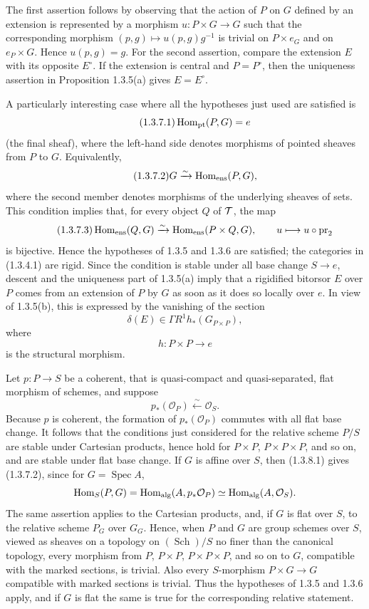 \documentclass[11pt]{article}
\providecommand{\Spec}{\operatorname{Spec}}
\providecommand{\Sch}{\operatorname{Sch}}
\providecommand{\cO}{\mathcal O}
\providecommand{\pr}{\operatorname{pr}}
\providecommand{\Hom}{\operatorname{Hom}}
\begin{document}
The first assertion follows by observing that the action of \(P\) on \(G\) defined by an extension is represented by a morphism \(u:P\times G\to G\) such that the corresponding morphism \((p,g)\mapsto u(p,g)g^{-1}\) is trivial on \(P\times e_G\) and on \(e_P\times G\).  Hence \(u(p,g)=g\).  For the second assertion, compare the extension \(E\) with its opposite \(E^\circ\).  If the extension is central and \(P=P^\circ\), then the uniqueness assertion in Proposition 1.3.5(a) gives \(E=E^\circ\).

A particularly interesting case where all the hypotheses just used are satisfied is
\begin{equation}\tag{1.3.7.1}
  \operatorname{Hom}_{\mathrm{pt}}(P,G)=e
\end{equation}
(the final sheaf), where the left-hand side denotes morphisms of pointed sheaves from \(P\) to \(G\).  Equivalently,
\begin{equation}\tag{1.3.7.2}
  G\xrightarrow{\sim}\operatorname{Hom}_{\mathrm{ens}}(P,G),
\end{equation}
where the second member denotes morphisms of the underlying sheaves of sets.  This condition implies that, for every object \(Q\) of \(\mathcal T\), the map
\begin{equation}\tag{1.3.7.3}
  \Homens(Q,G)\xrightarrow{\sim}\Homens(P\times Q,G),\qquad
  u\longmapsto u\circ\pr_2
\end{equation}
is bijective.  Hence the hypotheses of 1.3.5 and 1.3.6 are satisfied; the categories in (1.3.4.1) are rigid.  Since the condition is stable under all base change \(S\to e\), descent and the uniqueness part of 1.3.5(a) imply that a rigidified bitorsor \(E\) over \(P\) comes from an extension of \(P\) by \(G\) as soon as it does so locally over \(e\).  In view of 1.3.5(b), this is expressed by the vanishing of the section
\[
  \delta(E)\in\Gamma R^1 h_*(G_{P\times P}),
\]
where
\[
  h:P\times P\to e
\]
is the structural morphism.

Let \(p:P\to S\) be a coherent, that is quasi-compact and quasi-separated, flat morphism of schemes, and suppose
\begin{equation}\tag{1.3.8.1}
  p_*(\cO_P)\xleftarrow{\sim}\cO_S.
\end{equation}
Because \(p\) is coherent, the formation of \(p_*(\cO_P)\) commutes with all flat base change.  It follows that the conditions just considered for the relative scheme \(P/S\) are stable under Cartesian products, hence hold for \(P\times P\), \(P\times P\times P\), and so on, and are stable under flat base change.  If \(G\) is affine over \(S\), then (1.3.8.1) gives (1.3.7.2), since for \(G=\Spec A\),
\[
  \Hom_S(P,G)=\Homalg(A,p_*\cO_P)
     \simeq \Homalg(A,\cO_S).
\]
The same assertion applies to the Cartesian products, and, if \(G\) is flat over \(S\), to the relative scheme \(P_G\) over \(G_G\).  Hence, when \(P\) and \(G\) are group schemes over \(S\), viewed as sheaves on a topology on \((\Sch)/S\) no finer than the canonical topology, every morphism from \(P\), \(P\times P\), \(P\times P\times P\), and so on to \(G\), compatible with the marked sections, is trivial.  Also every \(S\)-morphism \(P\times G\to G\) compatible with marked sections is trivial.  Thus the hypotheses of 1.3.5 and 1.3.6 apply, and if \(G\) is flat the same is true for the corresponding relative statement.
\end{document}
